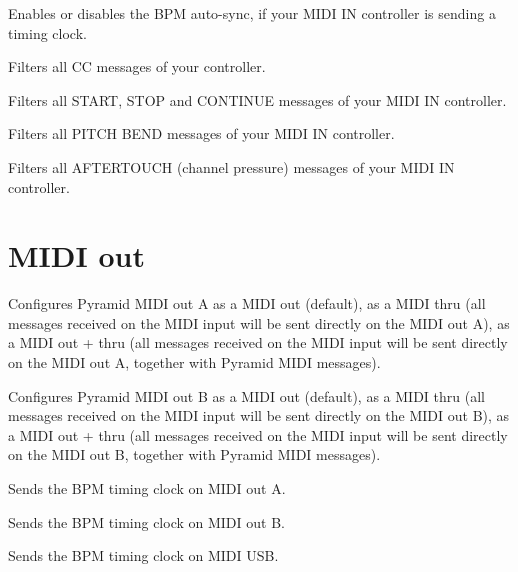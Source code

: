   

Enables or disables the BPM auto-sync, if your MIDI IN controller is sending a timing clock.

  

Filters all CC messages of your controller.

  

Filters all START, STOP and CONTINUE messages of your MIDI IN controller.

  

Filters all PITCH BEND messages of your MIDI IN controller.

  

Filters all AFTERTOUCH (channel pressure) messages of your MIDI IN controller.


\section{MIDI out}

   

Configures Pyramid MIDI out A as a MIDI out (default), as a MIDI thru (all messages received on the MIDI input will be sent directly on the MIDI out A), as a MIDI out + thru (all messages received on the MIDI input will be sent directly on the MIDI out A, together with Pyramid MIDI messages).

   

Configures Pyramid MIDI out B as a MIDI out (default), as a MIDI thru (all messages received on the MIDI input will be sent directly on the MIDI out B), as a MIDI out + thru (all messages received on the MIDI input will be sent directly on the MIDI out B, together with Pyramid MIDI messages).

  

Sends the BPM timing clock on MIDI out A.

  

Sends the BPM timing clock on MIDI out B.

  

Sends the BPM timing clock on MIDI USB.

